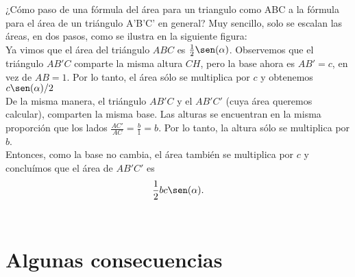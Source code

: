 ¿Cómo paso de una fórmula del área para un triangulo como ABC a la fórmula para el área de un triángulo A'B'C' en general? Muy sencillo, solo se escalan las áreas, en dos pasos, como se ilustra en la siguiente figura:\\

Ya vimos que el área del triángulo $ABC$ es $\frac{1}{2}\sen(\alpha)$. Observemos que el triángulo $AB'C$ comparte la misma altura $CH$, pero la base ahora es $AB'=c$, en vez de $AB=1$. Por lo tanto, el área sólo se multiplica por $c$ y obtenemos $c\sen(\alpha)/2$ \\

De la misma manera, el triángulo $AB'C$ y el $AB'C'$ (cuya área queremos calcular), comparten la misma base.  Las alturas se encuentran en la misma proporción que los lados $\frac{AC'}{AC}=\frac{b}{1}=b$. Por lo tanto, la altura sólo se multiplica por $b$.\\

Entonces, como la base no cambia, el área también se multiplica por $c$ y concluímos que el área de $AB'C'$ es $$\frac{1}{2}bc \sen(\alpha).$$\\

\newpage

\section{Algunas consecuencias}

